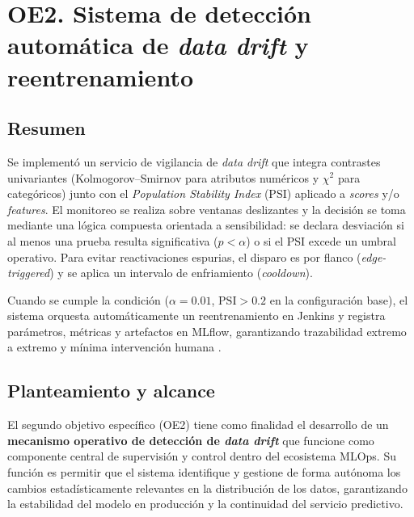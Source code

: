 
\section{OE2. Sistema de detección automática de \textit{data drift} y reentrenamiento}
\label{sec:oe2}

\subsection*{Resumen}
Se implementó un servicio de vigilancia de \textit{data drift} que integra contrastes univariantes (Kolmogorov–Smirnov para atributos numéricos y $\chi^2$ para categóricos) junto con el \textit{Population Stability Index} (PSI) aplicado a \textit{scores} y/o \textit{features}. El monitoreo se realiza sobre ventanas deslizantes y la decisión se toma mediante una lógica compuesta orientada a sensibilidad: se declara desviación si al menos una prueba resulta significativa ($p<\alpha$) o si el PSI excede un umbral operativo. Para evitar reactivaciones espurias, el disparo es por flanco (\textit{edge-triggered}) y se aplica un intervalo de enfriamiento (\textit{cooldown}).

Cuando se cumple la condición ($\alpha=0.01$, $\mathrm{PSI}>0.2$ en la configuración base), el sistema orquesta automáticamente un reentrenamiento en Jenkins y registra parámetros, métricas y artefactos en MLflow, garantizando trazabilidad extremo a extremo y mínima intervención humana \citep{Lu2019,Chawla2021,Nguyen2023,Chen2022}.


\subsection{Planteamiento y alcance}

El segundo objetivo específico (OE2) tiene como finalidad el desarrollo de un \textbf{mecanismo operativo de detección de \textit{data drift}} que funcione como componente central de supervisión y control dentro del ecosistema MLOps.  
Su función es permitir que el sistema identifique y gestione de forma autónoma los cambios estadísticamente relevantes en la distribución de los datos, garantizando la estabilidad del modelo en producción y la continuidad del servicio predictivo.


